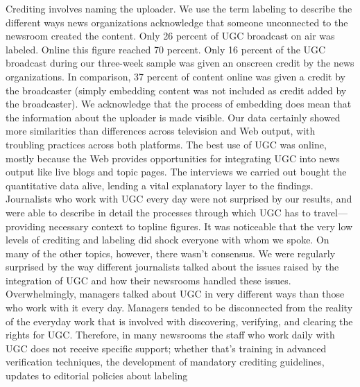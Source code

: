 \begin{enumerate}
Crediting involves naming the uploader. We use the term labeling to
describe the different ways news organizations acknowledge that someone
unconnected to the newsroom created the content. Only 26 percent of
UGC broadcast on air was labeled. Online this figure reached 70 percent.
Only 16 percent of the UGC broadcast during our three-week sample
was given an onscreen credit by the news organizations. In comparison,
37 percent of content online was given a credit by the broadcaster (simply
embedding content was not included as credit added by the broadcaster).
We acknowledge that the process of embedding does mean that the information
about the uploader is made visible.
Our data certainly showed more similarities than differences across television
and Web output, with troubling practices across both platforms. The
best use of UGC was online, mostly because the Web provides opportunities
for integrating UGC into news output like live blogs and topic pages.
The interviews we carried out bought the quantitative data alive, lending
a vital explanatory layer to the findings. Journalists who work with UGC
every day were not surprised by our results, and were able to describe in
detail the processes through which UGC has to travel—providing necessary
context to topline figures. It was noticeable that the very low levels of
crediting and labeling did shock everyone with whom we spoke.
On many of the other topics, however, there wasn't consensus. We were regularly
surprised by the way different journalists talked about the issues raised
by the integration of UGC and how their newsrooms handled these issues.
Overwhelmingly, managers talked about UGC in very different ways than
those who work with it every day. Managers tended to be disconnected
from the reality of the everyday work that is involved with discovering, verifying,
and clearing the rights for UGC. Therefore, in many newsrooms the
staff who work daily with UGC does not receive specific support; whether
that's training in advanced verification techniques, the development of
mandatory crediting guidelines, updates to editorial policies about labeling


\end{enumerate}
